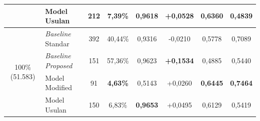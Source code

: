\begin{table}[htbp]
{\begin{tabular}{clcccccc}
 & Model Usulan & 212 & 7,39\% & \textbf{0,9618} & +0,0528 & 0,6360 & 0,4839 \\
\midrule
\multirow{4}{*}{100\% (51.583)} & \textit{Baseline} Standar & 392 & 40,44\% & 0,9316 & -0,0210 & 0,5778 & 0,7089 \\
 & \textit{Baseline Proposed} & 151 & 57,36\% & 0,9623 & \textbf{+0,1534} & 0,4885 & 0,5440 \\
 & Model Modified & 91 & \textbf{4,63\%} & 0,5143 & +0,0260 & \textbf{0,6445} & \textbf{0,7464} \\
 & Model Usulan & 150 & 6,83\% & \textbf{0,9653} & +0,0495 & 0,6129 & 0,5419 \\
\bottomrule
\end{tabular}%
}
\end{table}
\endgroup
